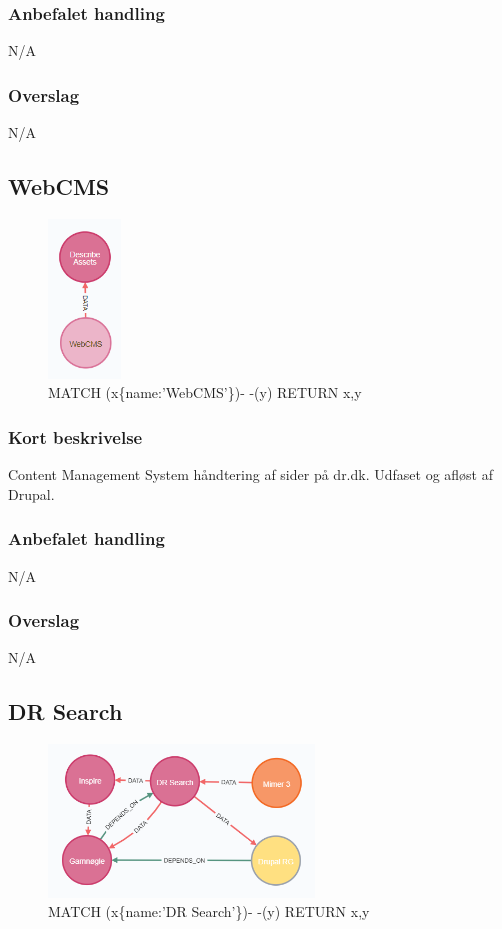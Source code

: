 \documentclass{article}
\begin{document}
\subsubsection{Anbefalet handling}
N/A
\subsubsection{Overslag}
N/A

\subsection{WebCMS}
\begin{figure}[h]
\includegraphics[height=120pt]{WebCMS.PNG}
\caption{MATCH (x\{name:'WebCMS'\})- -(y) RETURN x,y}
\end{figure}
\subsubsection{Kort beskrivelse}
Content Management System håndtering af sider på dr.dk. Udfaset og afløst af Drupal.
\subsubsection{Anbefalet handling}
N/A
\subsubsection{Overslag}
N/A

\subsection{DR Search}
\begin{figure}[h]
\includegraphics[width=200pt]{DRSearch.PNG}
\caption{MATCH (x\{name:'DR Search'\})- -(y) RETURN x,y}
\end{figure}
\end{document}
